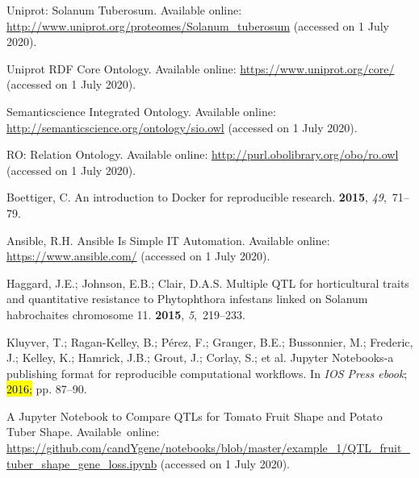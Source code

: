 \documentclass[applsci,article,accept,moreauthors,pdftex]{Definitions/mdpi}
\begin{document}
{\begin{thebibliography}{999}
{
{Uniprot: Solanum Tuberosum}.
\newblock Available online:  \url{http://www.uniprot.org/proteomes/Solanum_tuberosum}
\newblock (accessed on 1 July 2020).

{Uniprot RDF Core Ontology}.
\newblock Available online:  \url{https://www.uniprot.org/core/}
\newblock (accessed on 1 July 2020).

{Semanticscience Integrated Ontology.}
\newblock Available online:  \url{http://semanticscience.org/ontology/sio.owl}
\newblock (accessed on 1 July 2020).

{RO: Relation Ontology}.
\newblock Available online:  \url{http://purl.obolibrary.org/obo/ro.owl}
\newblock (accessed on 1 July 2020).

Boettiger, C.
\newblock An introduction to Docker for reproducible research.
 {\bf 2015}, {\em
  49},~71--79.

Ansible, R.H.
\newblock Ansible Is Simple IT Automation.
\newblock Available online:  \url{https://www.ansible.com/}
\newblock (accessed on 1 July 2020).

Haggard, J.E.; Johnson, E.B.; Clair, D.A.S.
\newblock Multiple QTL for horticultural traits and quantitative resistance to
  Phytophthora infestans linked on Solanum habrochaites chromosome 11.
 {\bf 2015}, {\em 5},~219--233.

Kluyver, T.; Ragan-Kelley, B.; P{\'e}rez, F.; Granger, B.E.; Bussonnier, M.;
  Frederic, J.; Kelley, K.; Hamrick, J.B.; Grout, J.; Corlay, S.; et al.
\newblock Jupyter Notebooks-a publishing format for reproducible computational
  workflows.
\newblock  In \emph{IOS Press ebook}; \hl{ 2016;} %
 pp. 87--90.

A Jupyter Notebook to Compare QTLs for Tomato Fruit Shape and Potato Tuber
  Shape.
\newblock
 Available~online:  \url{https://github.com/candYgene/notebooks/blob/master/example_1/QTL_fruit_tuber_shape_gene_loss.ipynb}
\newblock (accessed on 1 July 2020).

}
\end{thebibliography}}
\end{document}
